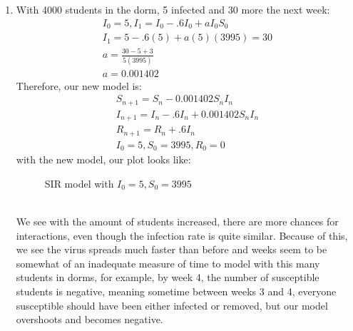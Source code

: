 \documentclass[12pt,letterpaper]{article}
\begin{document}
\begin{enumerate}
\begin{enumerate}
  \item With 4000 students in the dorm, 5 infected and 30 more the next week: 
  \begin{eqnarray*}
    I_{0} = 5, I_{1} = I_{0}-.6I_{0}+aI_{0}S_{0}\\
    I_{1} = 5 - .6(5) + a(5)(3995) = 30\\
    a = \frac{30-5+3}{5(3995)}\\
    a = 0.001402
  \end{eqnarray*}
  Therefore, our new model is: 
  \begin{eqnarray*}
    S_{n+1} = S_{n} - 0.001402S_{n}I_{n}\\
    I_{n+1} = I_{n} - .6I_{n} + 0.001402S_{n}I_{n}\\
    R_{n+1} = R_{n} + .6I_{n} \\
    I_{0} = 5, S_{0} = 3995, R_{0} = 0
  \end{eqnarray*}
  with the new model, our plot looks like: 
  \begin{figure}[!htb]
    \caption{\label{fig:13} SIR model with $I_{0} = 5, S_{0} = 3995$}
  \end{figure}\\
\pagebreak
  We see with the amount of students increased, there are more chances for interactions, 
  even though the infection rate is quite similar. Because of this, we see the virus spreads
  much faster than before and weeks seem to be somewhat of an inadequate measure of time 
  to model with this many students in dorms, for example, by week 4, the number of susceptible 
  students is negative, meaning sometime between weeks 3 and 4, everyone susceptible should have 
  been either infected or removed, but our model overshoots and becomes negative. 
\end{enumerate}

\end{enumerate}
\end{document}
